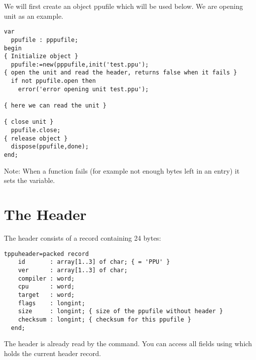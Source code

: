 We will first create an object ppufile which will be used below. We are
opening unit  as an example.

\begin{verbatim}
var
  ppufile : pppufile;
begin
{ Initialize object }
  ppufile:=new(pppufile,init('test.ppu');
{ open the unit and read the header, returns false when it fails }
  if not ppufile.open then
    error('error opening unit test.ppu');

{ here we can read the unit }

{ close unit }
  ppufile.close;
{ release object }
  dispose(ppufile,done);
end;
\end{verbatim}

Note: When a function fails (for example not enough bytes left in an
entry) it sets the  variable.

\section{The Header}

The header consists of a record containing 24 bytes:

\begin{verbatim}
tppuheader=packed record
    id       : array[1..3] of char; { = 'PPU' }
    ver      : array[1..3] of char;
    compiler : word;
    cpu      : word;
    target   : word;
    flags    : longint;
    size     : longint; { size of the ppufile without header }
    checksum : longint; { checksum for this ppufile }
  end;
\end{verbatim}

The header is already read by the  command.
You can access all fields using  which holds
the current header record.

